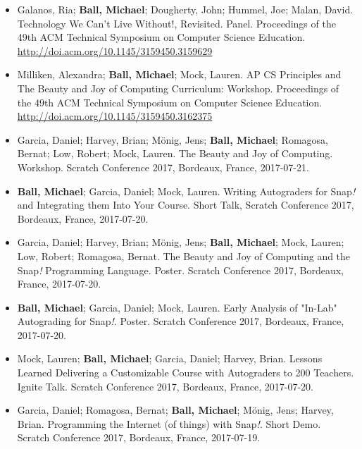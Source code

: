\begin{itemize}
    \item{Galanos, Ria; \textbf{Ball, Michael}; Dougherty, John; Hummel, Joe; Malan, David. Technology We Can't Live Without!, Revisited. Panel. Proceedings of the 49th ACM Technical Symposium on Computer Science Education.} \href{http://doi.acm.org/10.1145/3159450.3159629}{http://doi.acm.org/10.1145/3159450.3159629}

    \item{Milliken, Alexandra; \textbf{Ball, Michael}; Mock, Lauren. AP CS Principles and The Beauty and Joy of Computing Curriculum: Workshop. Proceedings of the 49th ACM Technical Symposium on Computer Science Education.} \href{http://doi.acm.org/10.1145/3159450.3162375}{http://doi.acm.org/10.1145/3159450.3162375}

    
    \item{Garcia, Daniel; Harvey, Brian; Mönig, Jens; \textbf{Ball, Michael}; Romagosa, Bernat; Low, Robert; Mock, Lauren. The Beauty and Joy of Computing. Workshop. Scratch Conference 2017, Bordeaux, France, 2017-07-21.}

    \item{\textbf{Ball, Michael}; Garcia, Daniel; Mock, Lauren. Writing Autograders for Snap\textit{!} and Integrating them Into Your Course. Short Talk, Scratch Conference 2017, Bordeaux, France, 2017-07-20.}

    \item{Garcia, Daniel; Harvey, Brian; Mönig, Jens; \textbf{Ball, Michael}; Mock, Lauren; Low, Robert; Romagosa, Bernat. The Beauty and Joy of Computing and the Snap\textit{!} Programming Language. Poster. Scratch Conference 2017, Bordeaux, France, 2017-07-20.}

    \item{\textbf{Ball, Michael}; Garcia, Daniel; Mock, Lauren. Early Analysis of "In-Lab" Autograding for Snap\textit{!}. Poster. Scratch Conference 2017, Bordeaux, France, 2017-07-20.}

    \item{Mock, Lauren; \textbf{Ball, Michael}; Garcia, Daniel; Harvey, Brian. Lessons Learned Delivering a Customizable Course with Autograders to 200 Teachers. Ignite Talk. Scratch Conference 2017, Bordeaux, France, 2017-07-20.}
    
    \item{Garcia, Daniel; Romagosa, Bernat; \textbf{Ball, Michael}; Mönig, Jens; Harvey, Brian. Programming the Internet (of things) with Snap\textit{!}. Short Demo. Scratch Conference 2017, Bordeaux, France, 2017-07-19.}


\end{itemize}
